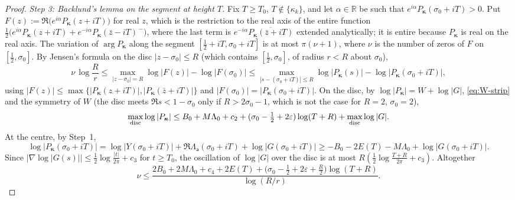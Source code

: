 \documentclass[11pt]{article}
\begin{document}
\begin{proof}
\emph{Step 3: Backlund's lemma on the segment at height $T$.} Fix $T\ge T_0$, $T\notin\{\kappa_k\}$, and let $\alpha\in\mathbb R$ be such that $e^{i\alpha}P_{\boldsymbol\kappa}(\sigma_0+iT)>0$. Put $F(z):=\Re\bigl(e^{i\alpha}P_{\boldsymbol\kappa}(z+iT)\bigr)$ for real $z$, which is the restriction to the real axis of the entire function $\frac12\bigl(e^{i\alpha}P_{\boldsymbol\kappa}(z+iT)+e^{-i\alpha}P_{\boldsymbol\kappa}(\bar z-iT)^{\,-}\bigr)$, where the last term is $e^{-i\alpha}\overline{P_{\boldsymbol\kappa}(\bar z+iT)}$ extended analytically; it is entire because $P_{\boldsymbol\kappa}$ is real on the real axis. The variation of $\arg P_{\boldsymbol\kappa}$ along the segment $[\tfrac12+iT,\sigma_0+iT]$ is at most $\pi(\nu+1)$, where $\nu$ is the number of zeros of $F$ on $[\tfrac12,\sigma_0]$. By Jensen's formula on the disc $|z-\sigma_0|\le R$ (which contains $[\tfrac12,\sigma_0]$, of radius $r<R$ about $\sigma_0$),
\[
 \nu\,\log\frac Rr\le\max_{|z-\sigma_0|=R}\log|F(z)|-\log|F(\sigma_0)|
 \le\max_{|s-(\sigma_0+iT)|\le R}\log|P_{\boldsymbol\kappa}(s)|-\log|P_{\boldsymbol\kappa}(\sigma_0+iT)| ,
\]
using $|F(z)|\le\max\{|P_{\boldsymbol\kappa}(z+iT)|,|P_{\boldsymbol\kappa}(\bar z+iT)|\}$ and $|F(\sigma_0)|=|P_{\boldsymbol\kappa}(\sigma_0+iT)|$. On the disc, by $\log|P_{\boldsymbol\kappa}|=W+\log|G|$, \eqref{eq:W-strip} and the symmetry of $W$ (the disc meets $\Re s<1-\sigma_0$ only if $R>2\sigma_0-1$, which is not the case for $R=2$, $\sigma_0=2$),
\[
 \max_{\rm disc}\log|P_{\boldsymbol\kappa}|\le B_0+M\Lambda_0+c_2+(\sigma_0-\tfrac12+2\varepsilon)\log(T+R)+\max_{\rm disc}\log|G| .
\]
At the centre, by Step~1,
\[
 \log|P_{\boldsymbol\kappa}(\sigma_0+iT)|=\log|Y(\sigma_0+iT)|+\Re\Lambda_{\mathsf a}(\sigma_0+iT)+\log|G(\sigma_0+iT)|\ge-B_0-2E(T)-M\Lambda_0+\log|G(\sigma_0+iT)| .
\]
Since $|\nabla\log|G(s)||\le\frac12\log\frac{|t|}{2\pi}+c_3$ for $t\ge T_0$, the oscillation of $\log|G|$ over the disc is at most $R(\frac12\log\frac{T+R}{2\pi}+c_3)$. Altogether
\begin{equation}\label{eq:nu}
 \nu\le\frac{2B_0+2M\Lambda_0+c_4+2E(T)+\bigl(\sigma_0-\tfrac12+2\varepsilon+\tfrac R2\bigr)\log(T+R)}{\log(R/r)} .
\end{equation}


\end{proof}
\end{document}
